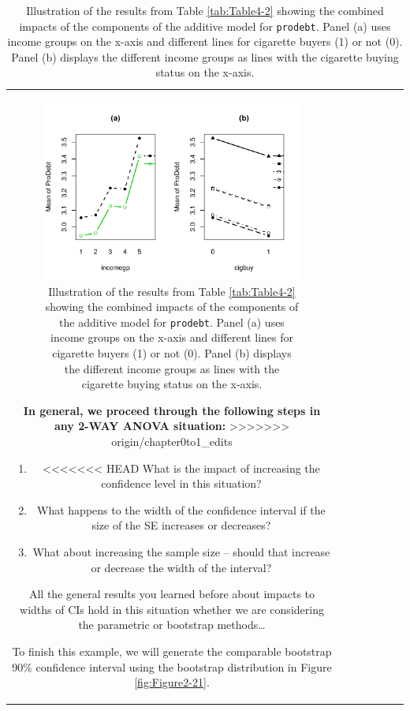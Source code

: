 \documentclass[]{book}
\newenvironment{Shaded}{\begin{snugshade}}{\end{snugshade}}
\theoremstyle{definition}
\theoremstyle{definition}
\theoremstyle{remark}
\begin{document}
\begin{longtable}[]{@{}ccccccc@{}}
\begin{minipage}[b]{0.10\columnwidth}
\begin{Shaded}
\begin{Highlighting}[]
\begin{Shaded}
\begin{Highlighting}[]
\begin{Shaded}
\begin{Highlighting}[]
\begin{Shaded}
\begin{Highlighting}[]
\begin{Shaded}
\begin{Highlighting}[]
\begin{figure}
\centering
\includegraphics{04-twoWayAnova_files/figure-latex/Figure4-16-1.pdf}
\caption{\label{fig:Figure4-16}Illustration of the results from Table \ref{tab:Table4-2}
showing the combined impacts of the components of the additive model for
\texttt{prodebt}. Panel (a) uses income groups on the x-axis and
different lines for cigarette buyers (1) or not (0). Panel (b) displays
the different income groups as lines with the cigarette buying status on
the x-axis.}
\end{figure}

\textbf{In general, we proceed through the following steps in any 2-WAY
ANOVA situation:}
>>>>>>> origin/chapter0to1_edits

\begin{enumerate}
\def\labelenumi{\arabic{enumi}.}
\item
<<<<<<< HEAD
  What is the impact of increasing the confidence level in this
  situation?
\item
  What happens to the width of the confidence interval if the size of
  the SE increases or decreases?
\item
  What about increasing the sample size -- should that increase or
  decrease the width of the interval?
\end{enumerate}

All the general results you learned before about impacts to widths of
CIs hold in this situation whether we are considering the parametric or
bootstrap methods\ldots{}

To finish this example, we will generate the comparable bootstrap 90\%
confidence interval using the bootstrap distribution in Figure
\ref{fig:Figure2-21}.


\end{Highlighting}
\end{Shaded}
\end{Highlighting}
\end{Shaded}
\end{Highlighting}
\end{Shaded}
\end{Highlighting}
\end{Shaded}
\end{Highlighting}
\end{Shaded}
\end{minipage}
\end{longtable}
\end{document}
